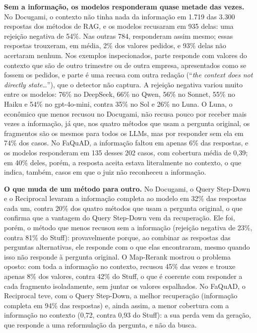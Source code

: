 \textbf{Sem a informação, os modelos responderam quase metade das vezes.} No Docugami, o contexto não tinha nada da informação em 1.719 das 3.300 respostas dos métodos de RAG, e os modelos recusaram em 935 delas: uma rejeição negativa de 54\%. Nas outras 784, responderam assim mesmo; essas respostas trouxeram, em média, 2\% dos valores pedidos, e 93\% delas não acertaram nenhum. Nos exemplos inspecionados, parte responde com valores do contexto que são de outro trimestre ou de outra empresa, apresentados como se fossem os pedidos, e parte é uma recusa com outra redação (``\emph{the context does not directly state}\ldots''), que o detector não captura. A rejeição negativa variou muito entre os modelos: 76\% no DeepSeek, 66\% no Qwen, 56\% no Sonnet, 55\% no Haiku e 54\% no gpt-4o-mini, contra 35\% no Sol e 26\% no Luna. O Luna, o econômico que menos recusou no Docugami, não recusa pouco por receber mais vezes a informação, já que, nos quatro métodos que usam a pergunta original, os fragmentos são os mesmos para todos os LLMs, mas por responder sem ela em 74\% dos casos. No FaQuAD, a informação faltou em apenas 6\% das respostas, e os modelos responderam em 135 desses 202 casos, com cobertura média de 0,39; em 40\% deles, porém, a resposta aceita estava literalmente no contexto, o que indica, também, casos em que o juiz não reconheceu a informação.

\textbf{O que muda de um método para outro.} No Docugami, o Query Step-Down e o Reciprocal levaram a informação completa ao modelo em 32\% das respostas cada um, contra 20\% dos quatro métodos que usam a pergunta original, o que confirma que a vantagem do Query Step-Down vem da recuperação. Ele foi, porém, o método que menos recusou sem a informação (rejeição negativa de 23\%, contra 81\% do Stuff): provavelmente porque, ao combinar as respostas das perguntas alternativas, ele responde com o que elas encontraram, mesmo quando isso não responde à pergunta original. O Map-Rerank mostrou o problema oposto: com toda a informação no contexto, recusou 45\% das vezes e trouxe apenas 8\% dos valores, contra 42\% do Stuff, o que é coerente com responder a cada fragmento isoladamente, sem juntar os valores espalhados. No FaQuAD, o Reciprocal teve, com o Query Step-Down, a melhor recuperação (informação completa em 94\% das respostas) e, ainda assim, a menor cobertura com a informação no contexto (0,72, contra 0,93 do Stuff): a sua perda vem da geração, que responde a uma reformulação da pergunta, e não da busca.

